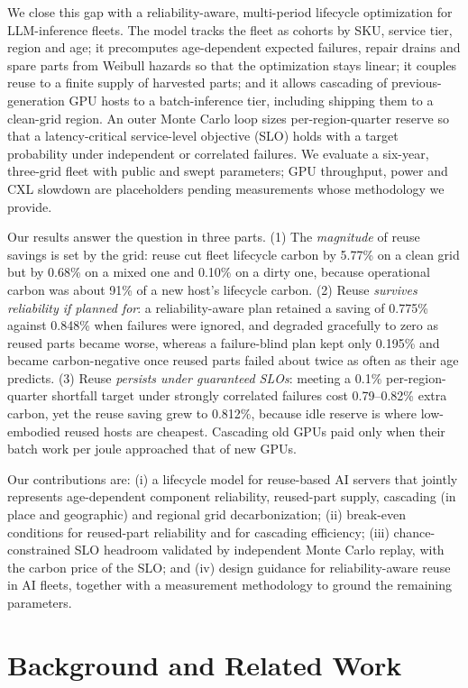 \documentclass[11pt]{article}
\begin{document}
We close this gap with a reliability-aware, multi-period lifecycle optimization for LLM-inference fleets. The model tracks the fleet as cohorts by SKU, service tier, region and age; it precomputes age-dependent expected failures, repair drains and spare parts from Weibull hazards so that the optimization stays linear; it couples reuse to a finite supply of harvested parts; and it allows cascading of previous-generation GPU hosts to a batch-inference tier, including shipping them to a clean-grid region. An outer Monte Carlo loop sizes per-region-quarter reserve so that a latency-critical service-level objective (SLO) holds with a target probability under independent or correlated failures. We evaluate a six-year, three-grid fleet with public and swept parameters; GPU throughput, power and CXL slowdown are placeholders pending measurements whose methodology we provide.

Our results answer the question in three parts. (1) The \emph{magnitude} of reuse savings is set by the grid: reuse cut fleet lifecycle carbon by 5.77\% on a clean grid but by 0.68\% on a mixed one and 0.10\% on a dirty one, because operational carbon was about 91\% of a new host's lifecycle carbon. (2) Reuse \emph{survives reliability if planned for}: a reliability-aware plan retained a saving of 0.775\% against 0.848\% when failures were ignored, and degraded gracefully to zero as reused parts became worse, whereas a failure-blind plan kept only 0.195\% and became carbon-negative once reused parts failed about twice as often as their age predicts. (3) Reuse \emph{persists under guaranteed SLOs}: meeting a 0.1\% per-region-quarter shortfall target under strongly correlated failures cost 0.79--0.82\% extra carbon, yet the reuse saving grew to 0.812\%, because idle reserve is where low-embodied reused hosts are cheapest. Cascading old GPUs paid only when their batch work per joule approached that of new GPUs.

Our contributions are: (i) a lifecycle model for reuse-based AI servers that jointly represents age-dependent component reliability, reused-part supply, cascading (in place and geographic) and regional grid decarbonization; (ii) break-even conditions for reused-part reliability and for cascading efficiency; (iii) chance-constrained SLO headroom validated by independent Monte Carlo replay, with the carbon price of the SLO; and (iv) design guidance for reliability-aware reuse in AI fleets, together with a measurement methodology to ground the remaining parameters.

\section{Background and Related Work}
\end{document}
